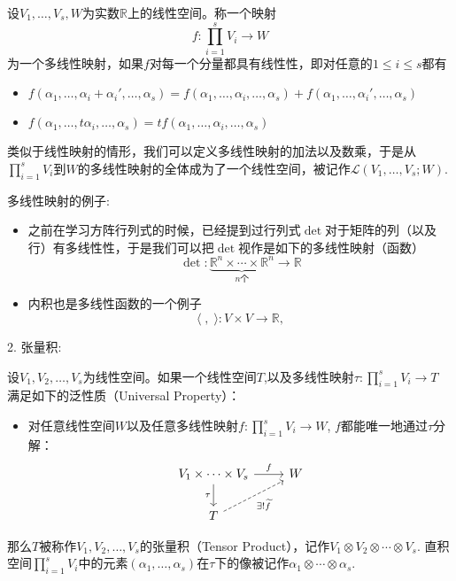 设$V_1,\ldots,V_s,W$为实数$\mathbb{R}$上的线性空间。称一个映射
$$f: \prod_{i=1}^s V_i \rightarrow W$$
为一个多线性映射，如果$f$对每一个分量都具有线性性，即对任意的$1\leqslant i \leqslant s$都有
\begin{itemize}
\item $f(\alpha_1,\ldots,\alpha_i+\alpha_i',\ldots,\alpha_s) = f(\alpha_1,\ldots,\alpha_i,\ldots,\alpha_s) + f(\alpha_1,\ldots,\alpha_i',\ldots,\alpha_s)$
\item $f(\alpha_1,\ldots,t\alpha_i,\ldots,\alpha_s) = tf(\alpha_1,\ldots,\alpha_i,\ldots,\alpha_s)$
\end{itemize}

类似于线性映射的情形，我们可以定义多线性映射的加法以及数乘，于是从$\prod\limits_{i=1}^s V_i$到$W$的多线性映射的全体成为了一个线性空间，被记作$\mathcal{L}(V_1,\ldots,V_s;W)$.

多线性映射的例子:

\begin{itemize}
\item 之前在学习方阵行列式的时候，已经提到过行列式$\det$对于矩阵的列（以及行）有多线性性，于是我们可以把$\det$视作是如下的多线性映射（函数）
$$\det: \underbrace{\mathbb{R}^n \times \cdots \times \mathbb{R}^n}_{\text{$n$个}} \rightarrow \mathbb{R}$$
\item 内积也是多线性函数的一个例子
$$\langle \;,\; \rangle: V\times V \rightarrow \mathbb{R},$$
\end{itemize}

\vspace{2em}

2. 张量积:

设$V_1,V_2,\ldots,V_s$为线性空间。如果一个线性空间$T$,以及多线性映射$\tau: \prod\limits_{i=1}^s V_i \to T$ 满足如下的泛性质（Universal Property）：
\begin{itemize}
\item 对任意线性空间$W$以及任意多线性映射$f: \prod\limits_{i=1}^s V_i \to W$, $f$都能唯一地通过$\tau$分解：
\[
\begin{tikzcd}
V_1 \times \cdots \times V_s \ar[r, "f"] \ar[d, "\tau"'] & W \\
T \ar[ur, dashrightarrow, "\exists! \widetilde{f}"'] &
\end{tikzcd}
\]
\end{itemize}
那么$T$被称作$V_1,V_2,\ldots,V_s$的张量积（Tensor Product），记作$V_1\otimes V_2\otimes \cdots \otimes V_s$. 直积空间$\prod\limits_{i=1}^s V_i$中的元素$(\alpha_1,\ldots,\alpha_s)$在$\tau$下的像被记作$\alpha_1\otimes\cdots\otimes\alpha_s.$

